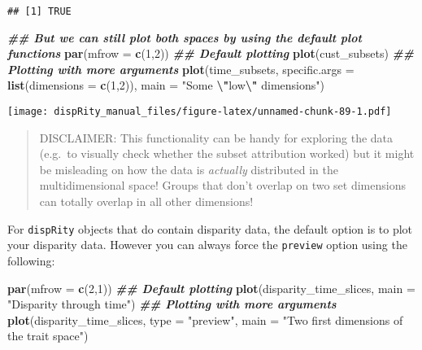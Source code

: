 \documentclass[
]{book}
\newenvironment{Shaded}{\begin{snugshade}}{\end{snugshade}}
\newcommand{\AttributeTok}[1]{\textcolor[rgb]{0.13,0.29,0.53}{#1}}
\newcommand{\DecValTok}[1]{\textcolor[rgb]{0.00,0.00,0.81}{#1}}
\newcommand{\DocumentationTok}[1]{\textcolor[rgb]{0.56,0.35,0.01}{\textbf{\textit{#1}}}}
\newcommand{\FunctionTok}[1]{\textcolor[rgb]{0.13,0.29,0.53}{\textbf{#1}}}
\newcommand{\NormalTok}[1]{#1}
\newcommand{\SpecialCharTok}[1]{\textcolor[rgb]{0.81,0.36,0.00}{\textbf{#1}}}
\newcommand{\StringTok}[1]{\textcolor[rgb]{0.31,0.60,0.02}{#1}}
\begin{document}
\begin{verbatim}
## [1] TRUE
\end{verbatim}

\begin{Shaded}
\begin{Highlighting}[]
\DocumentationTok{\#\# But we can still plot both spaces by using the default plot functions}
\FunctionTok{par}\NormalTok{(}\AttributeTok{mfrow =} \FunctionTok{c}\NormalTok{(}\DecValTok{1}\NormalTok{,}\DecValTok{2}\NormalTok{))}
\DocumentationTok{\#\# Default plotting}
\FunctionTok{plot}\NormalTok{(cust\_subsets)}
\DocumentationTok{\#\# Plotting with more arguments}
\FunctionTok{plot}\NormalTok{(time\_subsets, }\AttributeTok{specific.args =} \FunctionTok{list}\NormalTok{(}\AttributeTok{dimensions =} \FunctionTok{c}\NormalTok{(}\DecValTok{1}\NormalTok{,}\DecValTok{2}\NormalTok{)),}
     \AttributeTok{main =} \StringTok{"Some }\SpecialCharTok{\textbackslash{}"}\StringTok{low}\SpecialCharTok{\textbackslash{}"}\StringTok{ dimensions"}\NormalTok{)}
\end{Highlighting}
\end{Shaded}

\texttt{[image: dispRity\_manual\_files/figure-latex/unnamed-chunk-89-1.pdf]}

\begin{quote}
DISCLAIMER: This functionality can be handy for exploring the data (e.g.~to visually check whether the subset attribution worked) but it might be misleading on how the data is \emph{actually} distributed in the multidimensional space!
Groups that don't overlap on two set dimensions can totally overlap in all other dimensions!
\end{quote}

For \texttt{dispRity} objects that do contain disparity data, the default option is to plot your disparity data.
However you can always force the \texttt{preview} option using the following:

\begin{Shaded}
\begin{Highlighting}[]
\FunctionTok{par}\NormalTok{(}\AttributeTok{mfrow =} \FunctionTok{c}\NormalTok{(}\DecValTok{2}\NormalTok{,}\DecValTok{1}\NormalTok{))}
\DocumentationTok{\#\# Default plotting}
\FunctionTok{plot}\NormalTok{(disparity\_time\_slices, }\AttributeTok{main =} \StringTok{"Disparity through time"}\NormalTok{)}
\DocumentationTok{\#\# Plotting with more arguments}
\FunctionTok{plot}\NormalTok{(disparity\_time\_slices, }\AttributeTok{type =} \StringTok{"preview"}\NormalTok{,}
     \AttributeTok{main =} \StringTok{"Two first dimensions of the trait space"}\NormalTok{)}
\end{Highlighting}
\end{Shaded}
\end{document}

